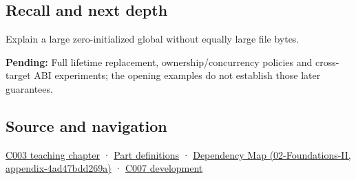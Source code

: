 \subsection{Recall and next depth}\label{appendix-17c93c4c2f19-recall-and-next-depth}

Explain a large zero-initialized global without equally large file bytes.

\textbf{Pending:} Full lifetime replacement, ownership/concurrency policies and cross-target ABI experiments; the opening examples do not establish those later guarantees.

\subsection{Source and navigation}\label{appendix-17c93c4c2f19-source-and-navigation}

\hyperref[01-foundations-i-ch002-where-the-bytes-live]{C003 teaching chapter} · \hyperref[appendix-fd090d982a15-m003---parts-41-60]{Part definitions} · \href{../02-Foundations-II/main.pdf\#nameddest=appendix-4ad47bdd269a}{Dependency Map (02-Foundations-II, appendix-4ad47bdd269a)} · \hyperref[01-foundations-i-ch002-a-name-does-not-decide-how-long-storage-lasts]{C007 development}
